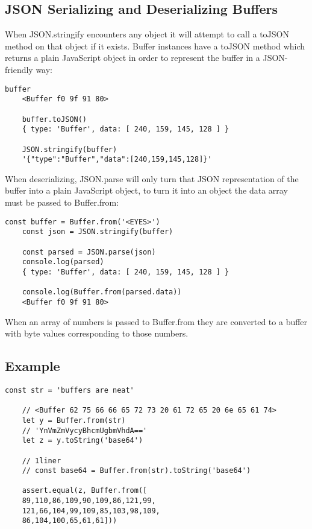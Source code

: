 \documentclass{scrartcl}
\begin{document}
\subsection{JSON Serializing and Deserializing Buffers}

 When JSON.stringify encounters any object it will attempt to call a toJSON method on that object if it exists. Buffer instances have a toJSON method which returns a plain JavaScript object in order to represent the buffer in a JSON-friendly way:

\begin{lstlisting}[style=ES6]
    buffer
    <Buffer f0 9f 91 80>

    buffer.toJSON()
    { type: 'Buffer', data: [ 240, 159, 145, 128 ] }

    JSON.stringify(buffer)
    '{"type":"Buffer","data":[240,159,145,128]}'
\end{lstlisting}

When deserializing, JSON.parse will only turn that JSON representation of the buffer into a plain JavaScript object, to turn it into an object the data array must be passed to Buffer.from:

\begin{lstlisting}[style=ES6]
    const buffer = Buffer.from('<EYES>')
    const json = JSON.stringify(buffer)

    const parsed = JSON.parse(json)
    console.log(parsed)
    { type: 'Buffer', data: [ 240, 159, 145, 128 ] }

    console.log(Buffer.from(parsed.data))
    <Buffer f0 9f 91 80>
\end{lstlisting}

When an array of numbers is passed to Buffer.from they are converted to a buffer with byte values corresponding to those numbers.

\subsection{Example}


\begin{lstlisting}[style=ES6]
    const str = 'buffers are neat'

    // <Buffer 62 75 66 66 65 72 73 20 61 72 65 20 6e 65 61 74>
    let y = Buffer.from(str)
    // 'YnVmZmVycyBhcmUgbmVhdA=='
    let z = y.toString('base64')

    // 1liner
    // const base64 = Buffer.from(str).toString('base64')

    assert.equal(z, Buffer.from([
    89,110,86,109,90,109,86,121,99,
    121,66,104,99,109,85,103,98,109,
    86,104,100,65,61,61]))
\end{lstlisting}
\end{document}

